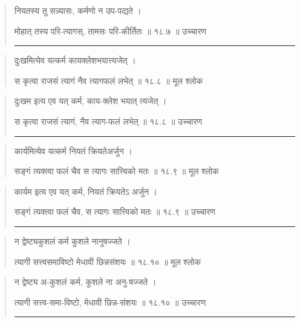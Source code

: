 \begin{quotation}

नियतस्य तु सन्न्यासः, कर्मणो न उप-पद्यते  ।  

मोहात् तस्य परि-त्यागस्, तामसः परि-कीर्तितः  ॥ १८.७ ॥  उच्चारण

\noindent\rule{16cm}{0.4pt} 
\end{quotation}


\begin{quotation}

दुःखमित्येव यत्कर्म कायक्लेशभयात्त्यजेत्‌  ।  

स कृत्वा राजसं त्यागं नैव त्यागफलं लभेत्‌  ॥ १८.८ ॥  मूल श्लोक
\end{quotation}

\begin{quotation}

दुःखम इत्य एव यत् कर्म, काय-क्लेश भयात् त्यजेत्‌  ।  

स कृत्वा राजसं त्यागं, नैव त्याग-फलं लभेत्‌  ॥ १८.८ ॥  उच्चारण

\noindent\rule{16cm}{0.4pt} 
\end{quotation}


\begin{quotation}

कार्यमित्येव यत्कर्म नियतं क्रियतेअर्जुन  ।  

सङ्‍गं त्यक्त्वा फलं चैव स त्यागः सात्त्विको मतः  ॥ १८.९ ॥  मूल श्लोक
\end{quotation}

\begin{quotation}

कार्यम इत्य एव यत् कर्म, नियतं क्रियतेऽ अर्जुन  ।  

सङ्‍गं त्यक्त्वा फलं चैव, स त्यागः सात्त्विको मतः  ॥ १८.९ ॥  उच्चारण

\noindent\rule{16cm}{0.4pt} 
\end{quotation}


\begin{quotation}

न द्वेष्ट्यकुशलं कर्म कुशले नानुषज्जते  ।  

त्यागी सत्त्वसमाविष्टो मेधावी छिन्नसंशयः  ॥ १८.१० ॥  मूल श्लोक
\end{quotation}

\begin{quotation}

न द्वेष्ट्य अ-कुशलं कर्म, कुशले ना अनु-षज्जते  ।  

त्यागी सत्त्व-समा-विष्टो, मेधावी छिन्न-संशयः  ॥ १८.१० ॥  उच्चारण

\noindent\rule{16cm}{0.4pt} 
\end{quotation}


